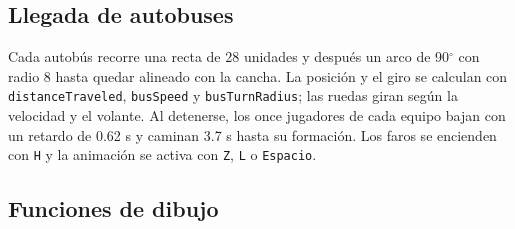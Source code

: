 \documentclass[12pt,letterpaper]{article}
\begin{document}
\subsection{Llegada de autobuses}
Cada autobús recorre una recta de 28 unidades y después un arco de 90$^\circ$ con radio 8 hasta
quedar alineado con la cancha. La posición y el giro se calculan con \texttt{distanceTraveled},
\texttt{busSpeed} y \texttt{busTurnRadius}; las ruedas giran según la velocidad y el volante. Al
detenerse, los once jugadores de cada equipo bajan con un retardo de 0.62 s y caminan 3.7 s hasta
su formación. Los faros se encienden con \texttt{H} y la animación se activa con \texttt{Z},
\texttt{L} o \texttt{Espacio}.

\subsection{Funciones de dibujo}
\end{document}
